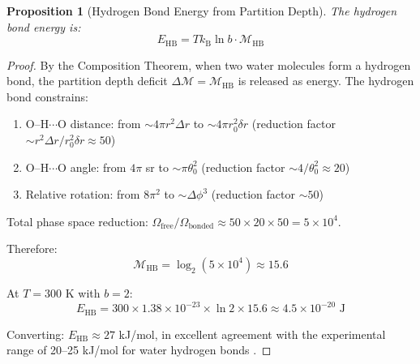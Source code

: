 \documentclass[twocolumn,10pt]{article}
\newtheorem{proposition}[theorem]{Proposition}
\theoremstyle{remark}
\newcommand{\kB}{k_{\mathrm{B}}}
\newcommand{\Depth}{\mathcal{M}}
\begin{document}
\begin{proposition}[Hydrogen Bond Energy from Partition Depth]
\label{prop:hbond_energy}
The hydrogen bond energy is:
\begin{equation}
    E_{\text{HB}} = T \kB \ln b \cdot \Depth_{\text{HB}}
\end{equation}
\end{proposition}

\begin{proof}
By the Composition Theorem, when two water molecules form a hydrogen bond, the partition depth deficit $\Delta\Depth = \Depth_{\text{HB}}$ is released as energy. The hydrogen bond constrains:
\begin{enumerate}
    \item O--H$\cdots$O distance: from $\sim 4\pi r^2 \Delta r$ to $\sim 4\pi r_0^2 \delta r$ (reduction factor $\sim r^2\Delta r / r_0^2 \delta r \approx 50$)
    \item O--H$\cdots$O angle: from $4\pi$ sr to $\sim \pi\theta_0^2$ (reduction factor $\sim 4/\theta_0^2 \approx 20$)
    \item Relative rotation: from $8\pi^2$ to $\sim \Delta\phi^3$ (reduction factor $\sim 50$)
\end{enumerate}

Total phase space reduction: $\Omega_{\text{free}}/\Omega_{\text{bonded}} \approx 50 \times 20 \times 50 = 5 \times 10^4$.

Therefore:
\begin{equation}
    \Depth_{\text{HB}} = \log_2(5 \times 10^4) \approx 15.6
\end{equation}

At $T = 300$ K with $b = 2$:
\begin{equation}
    E_{\text{HB}} = 300 \times 1.38 \times 10^{-23} \times \ln 2 \times 15.6 \approx 4.5 \times 10^{-20} \text{ J}
\end{equation}

Converting: $E_{\text{HB}} \approx 27$ kJ/mol, in excellent agreement with the experimental range of 20--25 kJ/mol for water hydrogen bonds \cite{suresh2000,chaplin2009}.
\end{proof}
\end{document}
